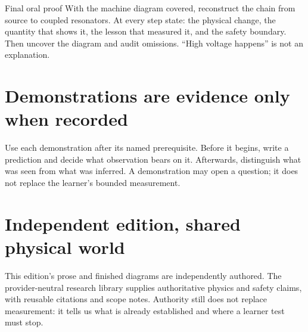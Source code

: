 \begin{center}
\end{center}

\begin{gate}{Final oral proof}
With the machine diagram covered, reconstruct the chain from source to coupled
resonators. At every step state: the physical change, the quantity that shows
it, the lesson that measured it, and the safety boundary. Then uncover the
diagram and audit omissions. ``High voltage happens'' is not an explanation.
\end{gate}

\section{Demonstrations are evidence only when recorded}
Use each demonstration after its named prerequisite. Before it begins, write a
prediction and decide what observation bears on it. Afterwards, distinguish
what was seen from what was inferred. A demonstration may open a question; it
does not replace the learner's bounded measurement.

\section{Independent edition, shared physical world}
This edition's prose and finished diagrams are independently authored. The
provider-neutral research library supplies authoritative physics and safety
claims, with reusable citations and scope notes. Authority still does not
replace measurement: it tells us what is already established and where a
learner test must stop.

